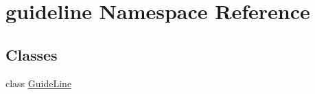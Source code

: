 \hypertarget{namespaceguideline}{}\section{guideline Namespace Reference}
\label{namespaceguideline}
\subsection*{Classes}
\begin{DoxyCompactItemize}
\item 
class \hyperlink{classguideline_1_1GuideLine}{Guide\+Line}
\end{DoxyCompactItemize}

